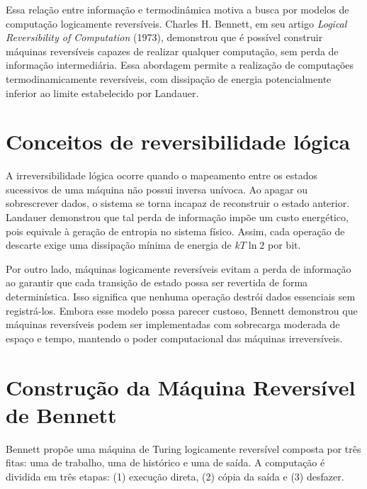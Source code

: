 \documentclass[conference]{IEEEtran}
\begin{document}
Essa relação entre informação e termodinâmica motiva a busca por modelos de computação logicamente reversíveis. Charles H. Bennett, em seu artigo \emph{Logical Reversibility of Computation} (1973), demonstrou que é possível construir máquinas reversíveis capazes de realizar qualquer computação, sem perda de informação intermediária. Essa abordagem permite a realização de computações termodinamicamente reversíveis, com dissipação de energia potencialmente inferior ao limite estabelecido por Landauer.

\section{Conceitos de reversibilidade lógica}

A irreversibilidade lógica ocorre quando o mapeamento entre os estados sucessivos de uma máquina não possui inversa unívoca. Ao apagar ou sobrescrever dados, o sistema se torna incapaz de reconstruir o estado anterior. Landauer demonstrou que tal perda de informação impõe um custo energético, pois equivale à geração de entropia no sistema físico. Assim, cada operação de descarte exige uma dissipação mínima de energia de $kT\ln2$ por bit.

Por outro lado, máquinas logicamente reversíveis evitam a perda de informação ao garantir que cada transição de estado possa ser revertida de forma determinística. Isso significa que nenhuma operação destrói dados essenciais sem registrá-los. Embora esse modelo possa parecer custoso, Bennett demonstrou que máquinas reversíveis podem ser implementadas com sobrecarga moderada de espaço e tempo, mantendo o poder computacional das máquinas irreversíveis.

\section{Construção da Máquina Reversível de Bennett}

Bennett propõe uma máquina de Turing logicamente reversível composta por três fitas: uma de trabalho, uma de histórico e uma de saída. A computação é dividida em três etapas: (1) execução direta, (2) cópia da saída e (3) desfazer.
\end{document}
